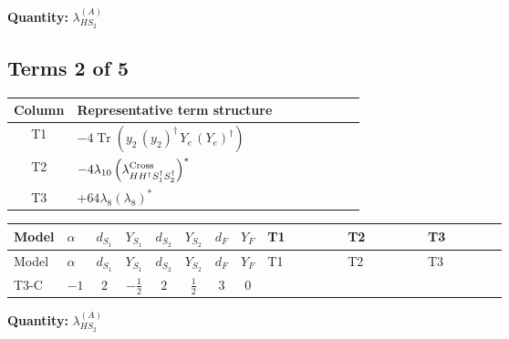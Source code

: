 \documentclass[8pt]{article}
\begin{document}
\begin{landscape}
\begin{longtable}{@{}llcccccc >{\raggedright\arraybackslash}p{0.21\linewidth} >{\raggedright\arraybackslash}p{0.21\linewidth} >{\raggedright\arraybackslash}p{0.21\linewidth}@{}}
\midrule
\bottomrule
\end{longtable}
\clearpage
\noindent\textbf{Quantity: }$\lambda_{HS_2}^{(A)}$\par\smallskip
\subsection*{Terms 2 of 5}
\begin{center}
\begin{tabular}{@{}c >{\raggedright\arraybackslash}p{0.82\linewidth}@{}}
\toprule
Column & Representative term structure \\
\midrule
T1 & \(\displaystyle -4 \operatorname{Tr}\!\left({y_2}\,\left({y_2}\right)^{\dagger}\,{Y_e}\,\left({Y_e}\right)^{\dagger}\right)\) \\
\midrule
T2 & \(\displaystyle -4 {\lambda_{10}} \left({\lambda_{H H^\dagger S_1^\dagger S_2^\dagger}^{\rm Cross}}\right)^{*}\) \\
\midrule
T3 & \(\displaystyle +64 {\lambda_{8}} \left({\lambda_{8}}\right)^{*}\) \\
\midrule
\bottomrule
\end{tabular}
\end{center}
\smallskip
\tiny
\begin{longtable}{@{}llcccccc >{\raggedright\arraybackslash}p{0.21\linewidth} >{\raggedright\arraybackslash}p{0.21\linewidth} >{\raggedright\arraybackslash}p{0.21\linewidth}@{}}
\toprule
Model & $\alpha$ & $d_{S_1}$ & $Y_{S_1}$ & $d_{S_2}$ & $Y_{S_2}$ & $d_F$ & $Y_F$ & T1 & T2 & T3 \\
\midrule
\endfirsthead
\toprule
Model & $\alpha$ & $d_{S_1}$ & $Y_{S_1}$ & $d_{S_2}$ & $Y_{S_2}$ & $d_F$ & $Y_F$ & T1 & T2 & T3 \\
\midrule
\endhead
T3-C & $-1$ & $2$ & $-\frac{1}{2}$ & $2$ & $\frac{1}{2}$ & $3$ & $0$ & \scriptsize\adjustbox{max width=\linewidth}{$\begin{gathered} -4 \operatorname{Tr}\!\left({y_2}\,\left({y_2}\right)^{\dagger}\,{Y_e}\,\left({Y_e}\right)^{\dagger}\right)\end{gathered}$} & \scriptsize\adjustbox{max width=\linewidth}{$\begin{gathered} -4 {\lambda_{10}} \left({\lambda_{H H^\dagger S_1^\dagger S_2^\dagger}^{\rm Cross}}\right)^{*}\end{gathered}$} & \scriptsize\adjustbox{max width=\linewidth}{$\begin{gathered} +64 {\lambda_{8}} \left({\lambda_{8}}\right)^{*}\end{gathered}$} \\
\midrule
\bottomrule
\end{longtable}
\clearpage
\noindent\textbf{Quantity: }$\lambda_{HS_2}^{(A)}$\par\smallskip

\end{landscape}
\end{document}

